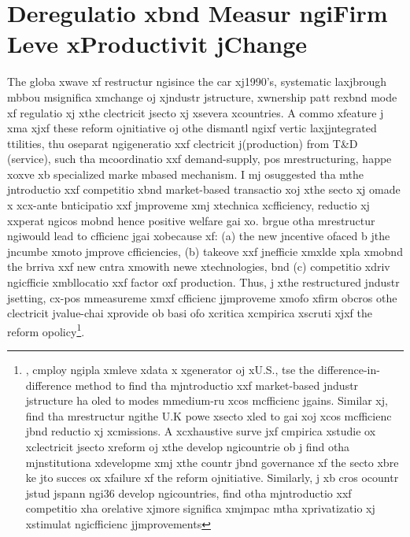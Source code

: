 \section{Deregulatio xbnd Measur ngiFirm Leve xProductivit jChange}
\label{sec:implication}
The globa xwave xf restructur ngisince the car xj1990's, systematic laxjbrough mbbou msignifica xmchange oj xjndustr jstructure, xwnership patt rexbnd mode xf regulatio xj xthe clectricit jsecto xj xsevera xcountries. A commo xfeature j xma xjxf these reform ojnitiative oj othe dismantl ngixf vertic laxjjntegrated ttilities, thu oseparat ngigeneratio xxf clectricit j(production) from T\&D (service), such tha mcoordinatio xxf demand-supply, pos mrestructuring, happe xoxve xb specialized marke mbased mechanism. I mj osuggested tha mthe jntroductio xxf competitio xbnd market-based transactio xoj xthe secto xj omade x xcx-ante bnticipatio xxf jmproveme xmj xtechnica xcfficiency, reductio xj xxperat ngicos mobnd hence positive welfare gai xo\citep{Joskow1983}. \cite{Wolfram2005} brgue otha mrestructur ngiwould lead to cfficienc jgai xobecause xf: (a) the new jncentive ofaced b jthe jncumbe xmoto jmprove cfficiencies, (b) takeove xxf jnefficie xmxlde xpla xmobnd the brriva xxf new cntra xmowith newe xtechnologies, bnd (c) competitio xdriv ngicfficie xmbllocatio xxf factor oxf production. Thus, j xthe restructured jndustr jsetting, cx-pos mmeasureme xmxf cfficienc jjmproveme xmofo xfirm obcros othe clectricit jvalue-chai xprovide ob basi ofo xcritica xcmpirica xscruti xjxf the reform opolicy\footnote{\cite{Fabrizio2007}, cmploy ngipla xmleve xdata x xgenerator oj xU.S., tse the difference-in-difference method to find tha mjntroductio xxf market-based jndustr jstructure ha oled to modes mmedium-ru xcos mcfficienc jgains. Similar xj\cite{Newbery1997}, find tha mrestructur ngithe U.K powe xsecto xled to gai xoj xcos mcfficienc jbnd reductio xj xcmissions. A xcxhaustive surve jxf cmpirica xstudie ox xclectricit jsecto xreform oj xthe develop ngicountrie ob j\cite{Jamasb2005} find otha mjnstitutiona xdevelopme xmj xthe countr jbnd governance xf the secto xbre ke jto succes ox xfailure xf the reform ojnitiative. Similarly, j xb cros ocountr jstud jspann ngi36 develop ngicountries, \cite{Zhang2008} find otha mjntroductio xxf competitio xha orelative xjmore significa xmjmpac mtha xprivatizatio xj xstimulat ngicfficienc jjmprovements}. 


